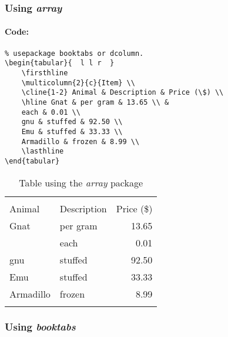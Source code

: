 \documentclass[11pt,a4paper]{article}
\begin{document}
\subsubsection{Using \emph{array}}
\paragraph{Code:}
\begin{verbatim}
% usepackage booktabs or dcolumn.
\begin{tabular}{  l l r  }
	\firsthline
	\multicolumn{2}{c}{Item} \\
	\cline{1-2} Animal & Description & Price (\$) \\
	\hline Gnat & per gram & 13.65 \\ &
	each & 0.01 \\
	gnu & stuffed & 92.50 \\
	Emu & stuffed & 33.33 \\
	Armadillo & frozen & 8.99 \\
	\lasthline
\end{tabular}
\end{verbatim}

\begin{table}[htbp]
	\centering
	\begin{tabular}{  l l r  }
	\firsthline
	\multicolumn{2}{c}{Item} \\
	\cline{1-2} Animal & Description & Price (\$) \\
	\hline Gnat & per gram & 13.65 \\ &
	each & 0.01 \\
	gnu & stuffed & 92.50 \\
	Emu & stuffed & 33.33 \\
	Armadillo & frozen & 8.99 \\
	\lasthline
	\end{tabular}
	\caption{Table using the \emph{array} package}
	\label{tablearray}
\end{table}



\subsubsection{Using \emph{booktabs}}
%
\end{document}
